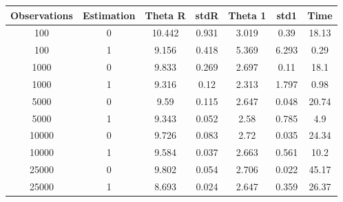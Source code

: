 \begin{tabular}{ccccccc}
\hline
Observations & Estimation & Theta R & stdR & Theta 1 & std1 & Time \\
\hline
100 & 0 & 10.442 & 0.931 & 3.019 & 0.39 & 18.13 \\
100 & 1 & 9.156 & 0.418 & 5.369 & 6.293 & 0.29 \\
1000 & 0 & 9.833 & 0.269 & 2.697 & 0.11 & 18.1 \\
1000 & 1 & 9.316 & 0.12 & 2.313 & 1.797 & 0.98 \\
5000 & 0 & 9.59 & 0.115 & 2.647 & 0.048 & 20.74 \\
5000 & 1 & 9.343 & 0.052 & 2.58 & 0.785 & 4.9 \\
10000 & 0 & 9.726 & 0.083 & 2.72 & 0.035 & 24.34 \\
10000 & 1 & 9.584 & 0.037 & 2.663 & 0.561 & 10.2 \\
25000 & 0 & 9.802 & 0.054 & 2.706 & 0.022 & 45.17 \\
25000 & 1 & 8.693 & 0.024 & 2.647 & 0.359 & 26.37 \\
\hline
\end{tabular}
